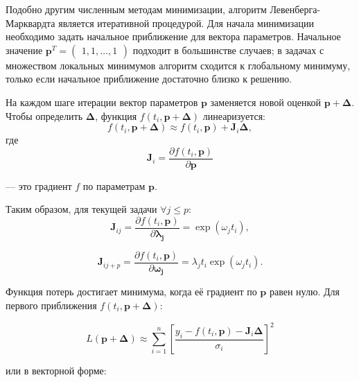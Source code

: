 Подобно другим численным методам минимизации, алгоритм Левенберга-Марквардта является итеративной процедурой. Для начала минимизации необходимо задать начальное приближение для вектора параметров. Начальное значение $\textbf{p}^T=\begin{pmatrix}1, 1, \dots, 1\end{pmatrix}$ подходит в большинстве случаев; в задачах с множеством локальных минимумов алгоритм сходится к глобальному минимуму, только если начальное приближение достаточно близко к решению.

На каждом шаге итерации вектор параметров $\textbf{p}$ заменяется новой оценкой $\textbf{p}+\boldsymbol{\Delta}$. Чтобы определить $\boldsymbol{\Delta}$, функция $f(t_i, \textbf{p} + \boldsymbol{\Delta})$ линеаризуется:
$$
	f(t_i, \textbf{p} + \boldsymbol{\Delta})\approx f(t_i, \textbf{p})+\mathbf{J}_i\boldsymbol{\Delta},
$$
где
\[
	\mathbf{J}_i = \frac{\partial f\left (t_i,  \mathbf{p}\right )}{\partial  \mathbf{p}}
\]

— это градиент $f$ по параметрам $\mathbf{p}$.

Таким образом, для текущей задачи $\forall j\le p:$
$$
	\mathbf{J}_{ij}=\frac{\partial f\left (t_i,  \mathbf{p}\right )}{\partial  \mathbf{\lambda_j}} = \exp(\omega_jt_i),
$$

$$
	\mathbf{J}_{ij+p}=\frac{\partial f\left (t_i,  \mathbf{p}\right )}{\partial  \mathbf{\omega_j}} = \lambda_jt_i\exp(\omega_jt_i).
$$

Функция потерь достигает минимума, когда её градиент по $\textbf{p}$ равен нулю. Для первого приближения $f\left (t_i,  \mathbf{p} + \boldsymbol\Delta\right )$:

$$
	L\left ( \mathbf{p} + \boldsymbol\Delta\right ) \approx \sum_{i=1}^n \left [\frac{y_i - f\left (t_i,  \mathbf{p}\right ) - \mathbf J_i \boldsymbol\Delta}{\sigma_i}\right ]^2
$$

или в векторной форме:

